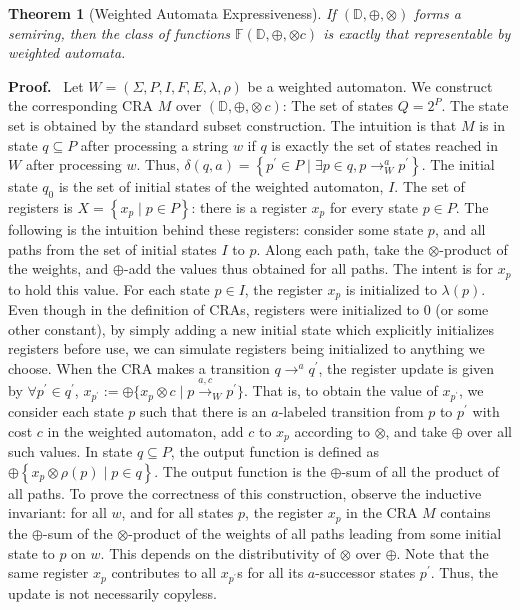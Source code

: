 \documentclass[11pt]{article}
\newtheorem{theorem}{Theorem}
\def\Proof{{\bf Proof.}}
\newcommand{\domain}{\ensuremath{\mathbb{D}}}
\newcommand{\CF}{{\mathbb F}}
\newcommand{\sradd}{\oplus}
\newcommand{\srmul}{\otimes}
\begin{document}
\begin{theorem}[Weighted Automata Expressiveness]\label{wa-cra}
If $\left(\domain,\sradd,\srmul\right)$ forms a semiring, then the
class of functions $\CF\left(\domain,\sradd,\srmul c\right)$
is exactly that representable by weighted automata.
\end{theorem}
\Proof~
Let $W=\left(\Sigma,P,I,F,E,\lambda,\rho\right)$ be a weighted
automaton. We construct the corresponding CRA $M$ over $\left(\domain,\sradd,\srmul\, c\right)$:
The set of states $Q=2^{P}$. The state set is obtained by the standard
subset construction. The intuition is that $M$ is in state $q\subseteq P$
after processing a string $w$ if $q$ is exactly the set of states
reached in $W$ after processing $w$. Thus, $\delta\left(q,a\right)=\left\{ p^{\prime}\in P\mid\exists p\in q,p\to_{W}^{a}p^{\prime}\right\} $.
The initial state $q_{0}$ is the set of initial states of the weighted
automaton, $I$.
The set of registers is $X=\left\{ x_{p}\mid p\in P\right\} $: there
is a register $x_{p}$ for every state $p\in P$. The following is the intuition behind these registers: consider some state $p$, and all paths from the set of initial states $I$ to $p$. Along each path, take the $\srmul$-product of the weights, and $\sradd$-add the values thus obtained for all paths. The intent is for $x_{p}$ to hold this value.
For each state $p\in I$, the register $x_{p}$ is initialized to
$\lambda\left(p\right)$. Even though in the definition of CRAs, registers were initialized to $0$ (or some other constant), by simply adding a new initial state which explicitly initializes registers before use, we can simulate registers being initialized to anything we choose.
When the CRA makes a transition $q\to^{a}q^{\prime}$, the register
update is given by $\forall p^{\prime}\in q^{\prime}$, $x_{p^{\prime}}:=\sradd\{x_{p}\srmul c\mid p\stackrel{a,c}{\rightarrow}_{W}p^{\prime}\}$.
That is, to obtain the value of $x_{p^{\prime}}$, we consider each
state $p$ such that there is an $a$-labeled transition from $p$
to $p^{\prime}$ with cost $c$ in the weighted automaton, add $c$
to $x_{p}$ according to $\srmul$, and take $\sradd$ over all such
values.
In state $q\subseteq P$, the output function is defined as $\sradd\left\{ x_{p}\srmul\rho\left(p\right)\mid p\in q\right\} $.
The output function is the $\sradd$-sum of all the product of all
paths.
To prove the correctness of this construction, observe the inductive
invariant: for all $w$, and for all states $p$, the register $x_{p}$
in the CRA $M$ contains the $\sradd$-sum of the $\srmul$-product
of the weights of all paths leading from some initial state to $p$
on $w$. This depends on the distributivity of $\srmul$ over $\sradd$.
Note that the same register $x_{p}$ contributes to all $x_{p^{\prime}}$s
for all its $a$-successor states $p^{\prime}$. Thus, the update
is not necessarily copyless.
\end{document}
